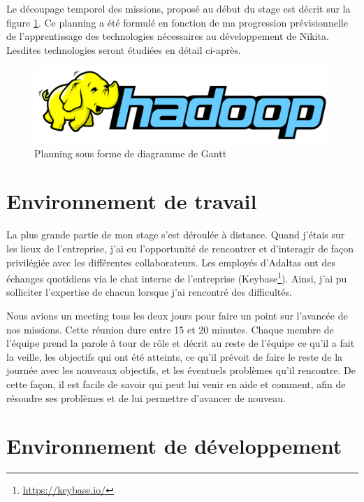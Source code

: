 \documentclass[12pt, french]{report}
\begin{document}
Le découpage temporel des missions, proposé au début du stage est décrit sur la figure \ref{fig:planning}. Ce planning a été formulé en fonction de ma progression prévisionnelle de l'apprentissage des technologies nécessaires au développement de Nikita. Lesdites technologies seront étudiées en détail ci-après.

\begin{figure}[h]
\includegraphics[scale=0.6]{assets/img/logo-hadoop.png}
\centering
\caption{Planning sous forme de diagramme de Gantt}
\label{fig:planning}
\end{figure}

\section{Environnement de travail}

La plus grande partie de mon stage s'est déroulée à distance. Quand j'étais sur les lieux de l'entreprise, j'ai eu l'opportunité de rencontrer et d'interagir de façon privilégiée avec les différentes collaborateurs. Les employés d’Adaltas ont des échanges quotidiens via le chat interne de l’entreprise (Keybase\footnote{\href{https://keybase.io/}{https://keybase.io/}}). Ainsi, j'ai pu solliciter l'expertise de chacun lorsque j'ai rencontré des difficultés.

Nous avions un meeting tous les deux jours pour faire un point sur l'avancée de nos missions. Cette réunion dure entre 15 et 20 minutes. Chaque membre de l'équipe prend la parole à tour de rôle et décrit au reste de l’équipe ce qu’il a fait la veille, les objectifs qui ont été atteints, ce qu’il prévoit de faire le reste de la journée avec les nouveaux objectifs, et les éventuels problèmes qu’il rencontre. De cette façon, il est facile de savoir qui peut lui venir en aide et comment, afin de résoudre ses problèmes et de lui permettre d’avancer de nouveau.

\section{Environnement de développement}
\end{document}
